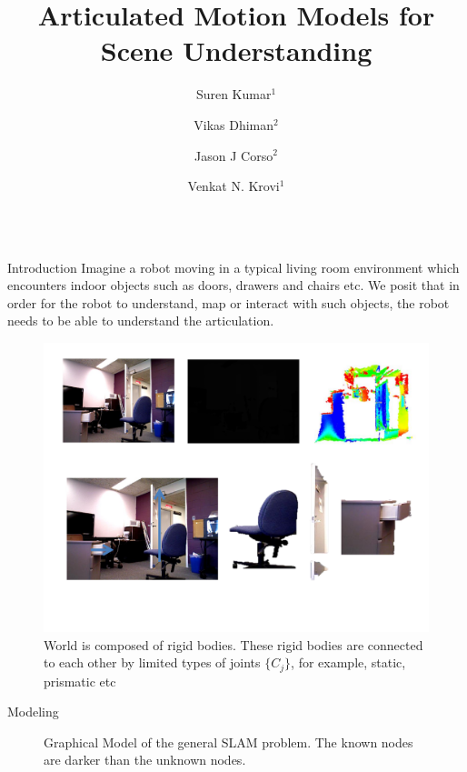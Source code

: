 \documentclass[final]{beamer}
\title{Articulated Motion Models for Scene Understanding}
\author{Suren Kumar$^1$ \and Vikas Dhiman$^2$ \and Jason J Corso$^2$ \and Venkat N. Krovi$^1$}
\institute{$^1$University at Buffalo  \hspace{1in} $^2$University of Michigan}
\newlength{\sepwid}
\newlength{\onecolwid}
\begin{document}
\begin{frame}[t]
  \centering
  \begin{columns}[t]												%
  \hspace{-\sepwid}
    \begin{column}{\onecolwid}
      \begin{block}{Introduction}
        Imagine a robot moving in a typical living room environment which encounters indoor objects such as doors, drawers and chairs etc. We posit that in order for the robot to understand, map or interact with such objects, the robot needs to be able to understand the articulation. 

        \begin{figure}
          \includegraphics[width=\onecolwid,trim=0 1in 0 3in,clip]{media/parts_of_scenes}
          \caption{World is composed of rigid bodies. These rigid bodies are connected to each other by limited types of joints $\{C_j\}$, for example, static, prismatic etc
}
        \end{figure}
      \end{block}

      \begin{block}{Modeling}
        \begin{figure}
          \centering
          \newcommand{\imagewidth}{\onecolwid}
          \scalebox{2.0}{\tiny }
          \caption{Graphical Model of the general SLAM problem. The known nodes are darker than the unknown nodes.
}
        \end{figure}


\end{block}
\end{column}
\end{columns}
\end{frame}
\end{document}
